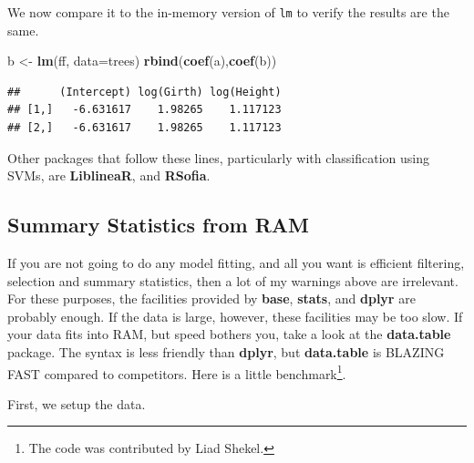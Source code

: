\documentclass[]{book}
\newenvironment{Shaded}{\begin{snugshade}}{\end{snugshade}}
\newcommand{\DataTypeTok}[1]{\textcolor[rgb]{0.13,0.29,0.53}{#1}}
\newcommand{\KeywordTok}[1]{\textcolor[rgb]{0.13,0.29,0.53}{\textbf{#1}}}
\newcommand{\NormalTok}[1]{#1}
\newcommand{\StringTok}[1]{\textcolor[rgb]{0.31,0.60,0.02}{#1}}
\theoremstyle{definition}
\theoremstyle{definition}
\theoremstyle{definition}
\theoremstyle{remark}
\begin{document}
We now compare it to the in-memory version of \texttt{lm} to verify the results are the same.

\begin{Shaded}
\begin{Highlighting}[]
\NormalTok{b <-}\StringTok{ }\KeywordTok{lm}\NormalTok{(ff, }\DataTypeTok{data=}\NormalTok{trees)}
\KeywordTok{rbind}\NormalTok{(}\KeywordTok{coef}\NormalTok{(a),}\KeywordTok{coef}\NormalTok{(b))}
\end{Highlighting}
\end{Shaded}

\begin{verbatim}
##      (Intercept) log(Girth) log(Height)
## [1,]   -6.631617    1.98265    1.117123
## [2,]   -6.631617    1.98265    1.117123
\end{verbatim}

Other packages that follow these lines, particularly with classification using SVMs, are \textbf{LiblineaR}, and \textbf{RSofia}.

\hypertarget{summary-statistics-from-ram}{%
\subsection{Summary Statistics from RAM}\label{summary-statistics-from-ram}}

If you are not going to do any model fitting, and all you want is efficient filtering, selection and summary statistics, then a lot of my warnings above are irrelevant.
For these purposes, the facilities provided by \textbf{base}, \textbf{stats}, and \textbf{dplyr} are probably enough.
If the data is large, however, these facilities may be too slow.
If your data fits into RAM, but speed bothers you, take a look at the \textbf{data.table} package.
The syntax is less friendly than \textbf{dplyr}, but \textbf{data.table} is BLAZING FAST compared to competitors.
Here is a little benchmark\footnote{The code was contributed by Liad Shekel.}.

First, we setup the data.
\end{document}
